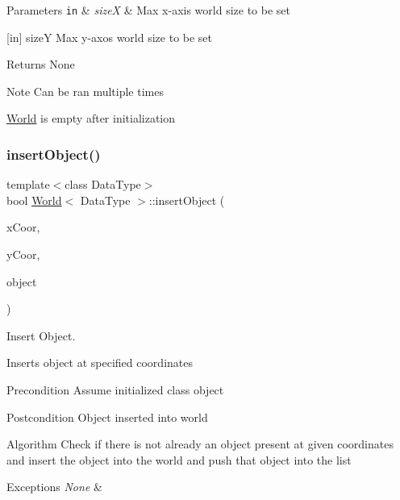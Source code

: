 \begin{DoxyParams}[1]{Parameters}
\mbox{\tt in}  & {\em sizeX} & Max x-\/axis world size to be set\\
\hline
\end{DoxyParams}
\mbox{[}in\mbox{]} sizeY Max y-\/axos world size to be set

\begin{DoxyReturn}{Returns}
None
\end{DoxyReturn}
\begin{DoxyNote}{Note}
Can be ran multiple times

\hyperlink{class_world}{World} is empty after initialization 
\end{DoxyNote}
\hypertarget{class_world_af07045149e9e92d7c3bfdce180825577}{}\label{class_world_af07045149e9e92d7c3bfdce180825577} 
\subsubsection{\texorpdfstring{insert\+Object()}{insertObject()}}
{\footnotesize\ttfamily template$<$class Data\+Type$>$ \\
bool \hyperlink{class_world}{World}$<$ Data\+Type $>$\+::insert\+Object (\begin{DoxyParamCaption}\item[{int}]{x\+Coor,  }\item[{int}]{y\+Coor,  }\item[{Data\+Type $\ast$}]{object }\end{DoxyParamCaption})}



Insert Object. 

Inserts object at specified coordinates

\begin{DoxyPrecond}{Precondition}
Assume initialized class object
\end{DoxyPrecond}
\begin{DoxyPostcond}{Postcondition}
Object inserted into world
\end{DoxyPostcond}
\begin{DoxyParagraph}{Algorithm}
Check if there is not already an object present at given coordinates and insert the object into the world and push that object into the list
\end{DoxyParagraph}

\begin{DoxyExceptions}{Exceptions}
{\em None} & \\
\hline
\end{DoxyExceptions}


